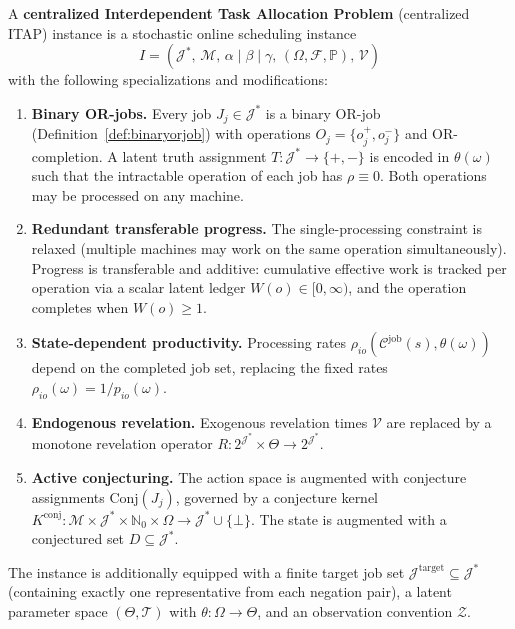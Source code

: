 \begin{definition}\label{def:citap}
A \textbf{centralized Interdependent Task Allocation Problem} (centralized ITAP)
instance is a stochastic online scheduling instance
\[
I = (\mathcal{J}^*,\, \mathcal{M},\, \alpha \mid \beta \mid \gamma,\,
(\Omega, \mathcal{F}, \mathbb{P}),\, \mathcal{V})
\]
with the following specializations and modifications:

\begin{enumerate}
    \item \textbf{Binary OR-jobs.} Every job $J_j \in \mathcal{J}^*$ is a binary
    OR-job (Definition~\ref{def:binaryorjob}) with operations
    $O_j = \{o_j^+, o_j^-\}$ and OR-completion. A latent truth assignment
    $T : \mathcal{J}^* \to \{+,-\}$ is encoded in $\theta(\omega)$ such that the
    intractable operation of each job has $\rho \equiv 0$. Both operations may be
    processed on any machine.

    \item \textbf{Redundant transferable progress.} The single-processing
    constraint is relaxed (multiple machines may work on the same operation
    simultaneously). Progress is transferable and additive: cumulative effective
    work is tracked per operation via a scalar latent ledger
    $W(o) \in [0,\infty)$, and the operation completes when $W(o) \ge 1$.

    \item \textbf{State-dependent productivity.} Processing rates
    $\rho_{io}(\mathcal{C}^{\mathrm{job}}(s), \theta(\omega))$ depend on the
    completed job set, replacing the fixed rates
    $\rho_{io}(\omega) = 1/p_{io}(\omega)$.

    \item \textbf{Endogenous revelation.} Exogenous revelation times $\mathcal{V}$
    are replaced by a monotone revelation operator
    $R : 2^{\mathcal{J}^*} \times \Theta \to 2^{\mathcal{J}^*}$.

    \item \textbf{Active conjecturing.} The action space is augmented with
    conjecture assignments $\mathrm{Conj}(J_j)$, governed by a conjecture kernel
    $K^{\mathrm{conj}} : \mathcal{M} \times \mathcal{J}^* \times \mathbb{N}_0
    \times \Omega \to \mathcal{J}^* \cup \{\bot\}$. The state is augmented with a
    conjectured set $D \subseteq \mathcal{J}^*$.
\end{enumerate}

The instance is additionally equipped with a finite target job set
$\mathcal{J}^{\mathrm{target}} \subseteq \mathcal{J}^*$ (containing exactly one
representative from each negation pair), a latent parameter space
$(\Theta, \mathcal{T})$ with $\theta : \Omega \to \Theta$, and an observation
convention $\mathcal{Z}$.
\end{definition}

